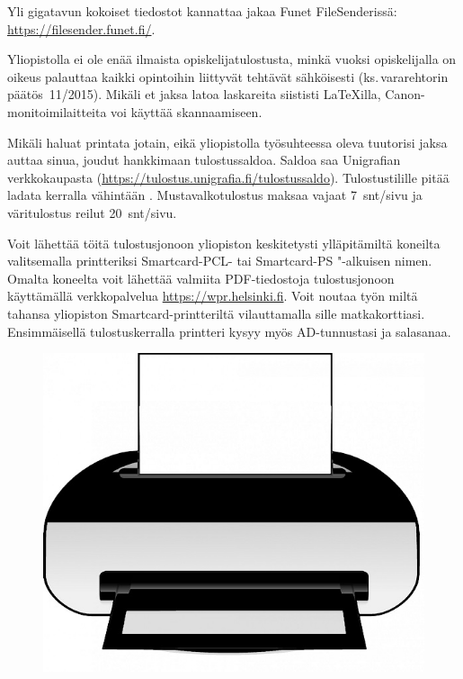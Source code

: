 \documentclass[a5paper, 8pt, twocolumn]{book} %
\numberwithin{equation}{section}
\begin{document}
Yli gigatavun kokoiset tiedostot kannattaa jakaa Funet FileSenderissä: \url{https://filesender.funet.fi/}.

Yliopistolla ei ole enää ilmaista opiskelija\-tulostusta, minkä vuoksi opiskelijalla on oikeus palauttaa kaikki opintoihin liittyvät tehtävät sähköisesti (ks.\,vara\-rehtorin päätös~11/2015). Mikäli et jaksa latoa laskareita siististi {\LaTeX}illa, Canon-monitoimilaitteita voi käyttää skannaamiseen.

Mikäli haluat printata jotain, eikä yliopistolla työsuhteessa oleva tuutorisi jaksa auttaa sinua, joudut hankkimaan tulostussaldoa. Saldoa saa Unigrafian verkkokaupasta (\url{https://tulostus.unigrafia.fi/tulostussaldo}). Tulostus\-tilille pitää ladata kerralla vähintään . Mustavalko\-tulostus maksaa vajaat 7~snt/sivu ja väri\-tulostus reilut 20~snt/sivu.

Voit lähettää töitä tulostus\-jonoon yliopiston keskitetysti ylläpitämiltä koneilta valitsemalla printteriksi Smartcard-PCL- tai Smartcard-PS "-alkuisen nimen. Omalta koneelta voit lähettää valmiita PDF-tiedostoja tulostusjonoon käyttämällä verkko\-palvelua \url{https://wpr.helsinki.fi}. Voit noutaa työn miltä tahansa yliopiston Smartcard-printteriltä vilauttamalla sille matkakorttiasi. Ensimmäisellä tulostuskerralla printteri kysyy myös AD-tunnustasi ja salasanaa.
\begin{figure}[b!]
\includegraphics[width=0.9\columnwidth]{computer-printer.jpg}
\end{figure}
\end{document}
